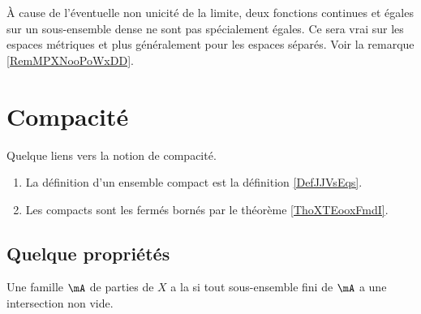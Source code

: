 \begin{remark}
    À cause de l'éventuelle non unicité de la limite, deux fonctions continues et égales sur un sous-ensemble dense ne sont pas spécialement égales. Ce sera vrai sur les espaces métriques et plus généralement pour les espaces séparés. Voir la remarque \ref{RemMPXNooPoWxDD}.
\end{remark}

\section{Compacité}

Quelque liens vers la notion de compacité.
\begin{enumerate}
    \item
        La définition d'un ensemble compact est la définition \ref{DefJJVsEqs}.
    \item
        Les compacts sont les fermés bornés par le théorème \ref{ThoXTEooxFmdI}.
\end{enumerate}

\subsection{Quelque propriétés}

\begin{definition}
    Une famille \( \mA\) de parties de \( X\) a la  si tout sous-ensemble fini de \( \mA\) a une intersection non vide.
\end{definition}

